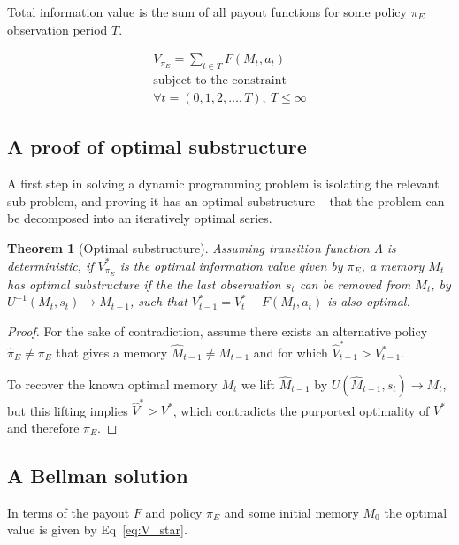 \documentclass[9pt,twocolumn,twoside]{pnas-new}
\newtheorem{theorem}{Theorem}
\begin{document}
Total information value is the sum of all payout functions for some policy $\pi_E$ observation period $T$. 

\begin{equation} \label{eq:V}
    \begin{split}
        V_{\pi_E} = \sum_{t \in T} F(M_t, a_t)\\
        \text{subject to the constraint}\\
        \forall t = (0,1,2,\ldots, T),\ T \leq \infty
    \end{split}
\end{equation}

\subsection*{A proof of optimal substructure}
A first step in solving a dynamic programming problem is isolating the relevant sub-problem, and proving it has an optimal substructure -- that the problem can be decomposed into an iteratively optimal series. 

\begin{theorem}[Optimal substructure] \label{theorem:opt_sub}
    Assuming transition function $\Lambda$ is deterministic, if $V^*_{\pi_E}$ is the optimal information value given by $\pi_E$, a memory $M_t$ has optimal substructure if the the last observation $s_t$ can be removed from $M_t$, by $U^{-1}(M_t, s_t) \rightarrow M_{t-1}$, such that $V^*_{t-1} = V^*_t - F(M_t, a_t)$ is also optimal. 
\end{theorem}
\begin{proof}
    For the sake of contradiction, assume there exists an alternative policy $\hat \pi_E \neq \pi_E$ that gives a memory $\hat M_{t-1} \neq M_{t-1}$ and for which $\hat V^*_{t-1} > V^*_{t-1}$. 

    To recover the known optimal memory $M_t$ we lift $\hat M_{t-1}$ by $U(\hat M_{t-1}, s_t) \rightarrow M_t$, but this lifting implies $\hat V^* > V^*$, which contradicts the purported optimality of $V^*$ and therefore $\pi_E$.
\end{proof}


\subsection*{A Bellman solution}
In terms of the payout $F$ and policy $\pi_E$ and some initial memory $M_0$ the optimal value is given by Eq~\ref{eq:V_star}.
\end{document}
